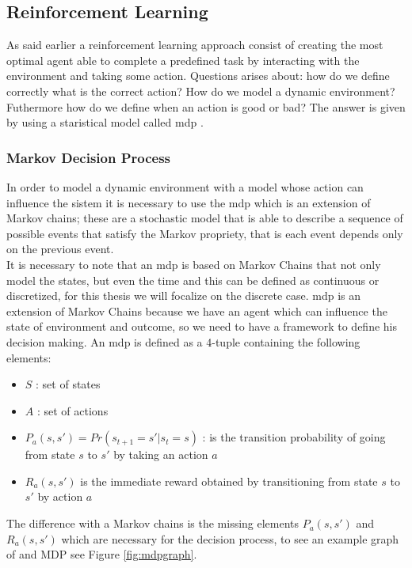 \subsection{Reinforcement Learning}
As said earlier a reinforcement learning approach consist of creating the most optimal agent able to complete a predefined task by interacting with the environment and taking some action. Questions arises about: how do we define correctly what is the correct action? How do we model a dynamic environment? Futhermore how do we define when an action is good or bad? The answer is given by using a staristical model called \acrfull{mdp} .
\subsubsection{Markov Decision Process}
In order to model a dynamic environment with a model whose action can influence the sistem it is necessary to use the \acrfull{mdp} which is an extension of Markov chains; these are a stochastic model that is able to describe a sequence of possible events that satisfy the Markov propriety, that is each event depends only on the previous event.\\
It is necessary to note that an \acrshort{mdp} is based on Markov Chains that not only model the states, but even the time and this can be defined as continuous or discretized, for this thesis we will focalize on the discrete case.
\acrshort{mdp} is an extension of Markov Chains because we have an agent which can influence the state of environment and outcome, so we need to have a framework to define his decision making. An \acrshort{mdp} is defined as a 4-tuple containing the following elements:
\begin{itemize}
	\item $S$ : set of states
	\item $A$ : set of actions
	\item $P_a (s, s') = Pr(s_{t+1} = s' \vert s_{t} = s)$ : is the transition probability of going from state $s$ to $s'$ by taking an action $a$
	\item $R_{a}(s,s')$ is the immediate reward obtained by transitioning from state $s$ to $s'$ by action $a$
\end{itemize}
The difference with a Markov chains is the missing elements $P_a (s, s')$ and $R_{a}(s,s')$ which are necessary for the decision process, to see an example graph of and MDP see Figure \ref{fig:mdpgraph}.
